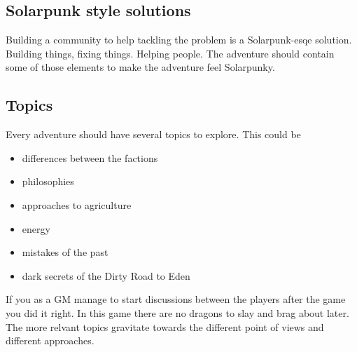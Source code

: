 \subsection{Solarpunk style solutions}

Building a community to help tackling the problem is a Solarpunk-esqe solution. Building things, fixing things. Helping people. The adventure should contain some of those elements to make the adventure feel Solarpunky.

\subsection{Topics}

Every adventure should have several topics to explore. This could be 
\begin{itemize}
    \item differences between the factions
    \item philosophies
    \item approaches to agriculture
    \item energy
    \item mistakes of the past
    \item dark secrets of the Dirty Road to Eden
\end{itemize}

If you as a GM manage to start discussions between the players after the game you did it right. In this game there are no dragons to slay and brag about later. The more relvant topics gravitate towards the different point of views and different approaches.
